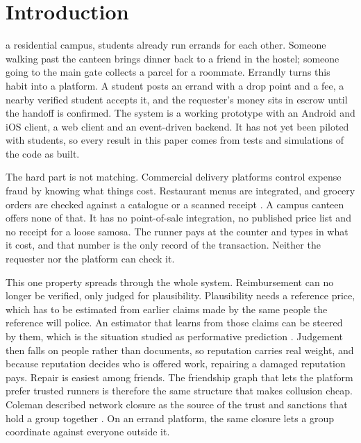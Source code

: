 \documentclass[journal]{IEEEtran}
\begin{document}
\section{Introduction}

 a residential campus, students already run errands for each
other. Someone walking past the canteen brings dinner back to a friend in the
hostel; someone going to the main gate collects a parcel for a roommate. Errandly
turns this habit into a platform. A student posts an errand with a drop point and
a fee, a nearby verified student accepts it, and the requester's money sits in
escrow until the handoff is confirmed. The system is a working prototype with an
Android and iOS client, a web client and an event-driven backend. It has not yet
been piloted with students, so every result in this paper comes from tests and
simulations of the code as built.

The hard part is not matching. Commercial delivery platforms control expense fraud
by knowing what things cost. Restaurant menus are integrated, and grocery orders are
checked against a catalogue or a scanned receipt \cite{alnaggar2021crowdsourced,le2019supply}.
A campus canteen offers none of that. It has no point-of-sale integration, no
published price list and no receipt for a loose samosa. The runner pays at the
counter and types in what it cost, and that number is the only record of the
transaction. Neither the requester nor the platform can check it.

This one property spreads through the whole system. Reimbursement can no longer be
verified, only judged for plausibility. Plausibility needs a reference price, which
has to be estimated from earlier claims made by the same people the reference will
police. An estimator that learns from those claims can be steered by them, which is
the situation studied as performative prediction \cite{perdomo2020performative}.
Judgement then falls on people rather than documents, so reputation carries real
weight, and because reputation decides who is offered work, repairing a damaged
reputation pays. Repair is easiest among friends. The friendship graph that lets the
platform prefer trusted runners is therefore the same structure that makes
collusion cheap. Coleman described network closure as the source of the trust and
sanctions that hold a group together \cite{coleman1988social}. On an errand
platform, the same closure lets a group coordinate against everyone outside it.
\end{document}
